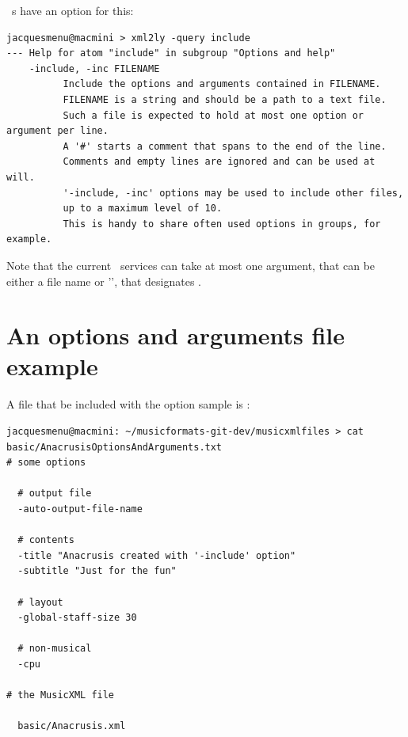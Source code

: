 \mf\ \converter s have an  option for this:
\begin{lstlisting}[language=Terminal]
jacquesmenu@macmini > xml2ly -query include
--- Help for atom "include" in subgroup "Options and help"
    -include, -inc FILENAME
          Include the options and arguments contained in FILENAME.
          FILENAME is a string and should be a path to a text file.
          Such a file is expected to hold at most one option or argument per line.
          A '#' starts a comment that spans to the end of the line.
          Comments and empty lines are ignored and can be used at will.
          '-include, -inc' options may be used to include other files,
          up to a maximum level of 10.
          This is handy to share often used options in groups, for example.
\end{lstlisting}

Note that the current \mf\ services can take at most one argument, that can be either a file name or '\code{-}', that designates \standardInput.


\section{An options and arguments file example}

A file that be included with the option sample is :
\begin{lstlisting}[language=Terminal]
jacquesmenu@macmini: ~/musicformats-git-dev/musicxmlfiles > cat basic/AnacrusisOptionsAndArguments.txt
# some options

  # output file
  -auto-output-file-name

  # contents
  -title "Anacrusis created with '-include' option"
  -subtitle "Just for the fun"

  # layout
  -global-staff-size 30

  # non-musical
  -cpu

# the MusicXML file

  basic/Anacrusis.xml
\end{lstlisting}

